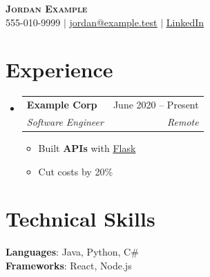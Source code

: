 \documentclass[letterpaper,11pt]{article}
\makeatletter
\newcommand{\resumeItem}[1]{\item\small{{#1 \vspace{-2pt}}}}
\newcommand{\resumeSubheading}[4]{
  \vspace{-2pt}\item
    \begin{tabular*}{0.97\textwidth}[t]{l@{\extracolsep{\fill}}r}
      \textbf{#1} & #2 \\
      \textit{\small#3} & \textit{\small #4} \\
    \end{tabular*}\vspace{-7pt}
}
\newcommand{\resumeSubHeadingListStart}{\begin{itemize}[leftmargin=0.15in, label={}]}
\newcommand{\resumeSubHeadingListEnd}{\end{itemize}}
\newcommand{\resumeItemListStart}{\begin{itemize}}
\newcommand{\resumeItemListEnd}{\end{itemize}\vspace{-5pt}}
\makeatother
\begin{document}
\begin{center}
    \textbf{\Huge \scshape Jordan Example} \\ \vspace{1pt}
    \small 555-010-9999 $|$ \href{mailto:jordan@example.test}{\underline{jordan@example.test}} $|$
    \href{https://linkedin.com/in/jordan-example}{\underline{LinkedIn}}
\end{center}
\section{Experience}
  \resumeSubHeadingListStart
    \resumeSubheading
      {Example Corp}{June 2020 -- Present}
      {Software Engineer}{Remote}
      \resumeItemListStart
        \resumeItem{Built \textbf{APIs} with \href{https://x.test}{Flask}}
        \resumeItem{Cut costs by 20\%}
      \resumeItemListEnd
  \resumeSubHeadingListEnd
\section{Technical Skills}
 \begin{itemize}[leftmargin=0.15in, label={}]
    \small{\item{
     \textbf{Languages}{: Java, Python, C\#} \\
     \textbf{Frameworks}{: React, Node.js}
    }}
 \end{itemize}
\end{document}

